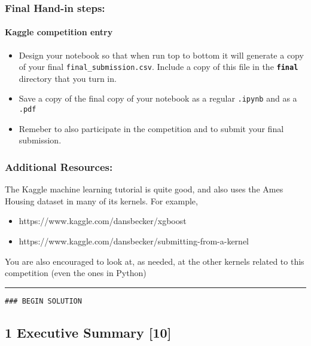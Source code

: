 \documentclass[11pt]{article}
\providecommand{\tightlist}{%
      \setlength{\itemsep}{0pt}\setlength{\parskip}{0pt}}
\begin{document}
\subsubsection{Final Hand-in steps:}\label{final-hand-in-steps}

\paragraph{Kaggle competition entry}\label{kaggle-competition-entry}

\begin{itemize}
\tightlist
\item
  Design your notebook so that when run top to bottom it will generate a
  copy of your final \texttt{final\_submission.csv}. Include a copy of
  this file in the \textbf{\texttt{final}} directory that you turn in.
\item
  Save a copy of the final copy of your notebook as a regular
  \texttt{.ipynb} and as a \texttt{.pdf}
\item
  Remeber to also participate in the competition and to submit your
  final submission.
\end{itemize}

\subsubsection{Additional Resources:}\label{additional-resources}

The Kaggle machine learning tutorial is quite good, and also uses the
Ames Housing dataset in many of its kernels. For example,

\begin{itemize}
\tightlist
\item
  https://www.kaggle.com/dansbecker/xgboost
\item
  https://www.kaggle.com/dansbecker/submitting-from-a-kernel
\end{itemize}

You are also encouraged to look at, as needed, at the other kernels
related to this competition (even the ones in Python)

\begin{center}\rule{0.5\linewidth}{\linethickness}\end{center}

    \texttt{\#\#\#\ BEGIN\ SOLUTION}

    \subsection{1 Executive Summary {[}10{]}}\label{executive-summary-10}
\end{document}

